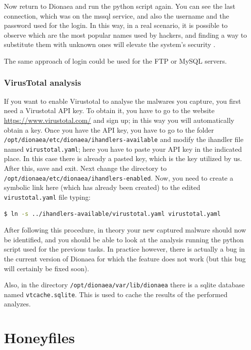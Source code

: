 \documentclass[epsfig,a4paper,11pt,titlepage,oneside,openany]{book}
\begin{document}
\begin{itemize}
Now return to Dionaea and run the python script again. You can see the last connection, which was on the mssql service, and also the username and the password used for the login. In this way, in a real scenario, it is possible to observe which are the most popular names used by hackers, and finding a way to substitute them with unknown ones will elevate the system’s security \cite{malicious_access}.

The same approach of login could be used for the FTP or MySQL servers.


\subsection{VirusTotal analysis}
If you want to enable Virustotal to analyse the malwares you capture, you first need a Virustotal API key. To obtain it, you have to go to the website \url{https://www.virustotal.com/} and sign up; in this way you will automatically obtain a key. Once you have the API key, you have to go to the folder \texttt{/opt/dionaea/etc/dionaea/ihandlers-available} and modify the ihandler file named \texttt{virustotal.yaml}; here you have to paste your API key in the indicated place. In this case there is already a pasted key, which is the key utilized by us. After this, save and exit. Next change the directory to \texttt{/opt/dionaea/etc/dionaea/ihandlers-enabled}. Now, you need to create a symbolic link here (which has already been created)  to the edited \texttt{virustotal.yaml} file typing:

\begin{lstlisting}[language=bash]
$ ln -s ../ihandlers-available/virustotal.yaml virustotal.yaml
\end{lstlisting}

\noindent After following this procedure, in theory your new captured malware should now be identified, and you should be able to look at the analysis running the python script used for the previous tasks. In practice however, there is actually a bug in the current version of Dionaea for which the feature does not work (but this bug will certainly be fixed soon).

Also, in the directory \texttt{/opt/dionaea/var/lib/dionaea} there is a sqlite database named  \linebreak \texttt{vtcache.sqlite}. This is used to cache the results of the performed analyzes.



\chapter{Honeyfiles}


\end{itemize}
\end{document}
